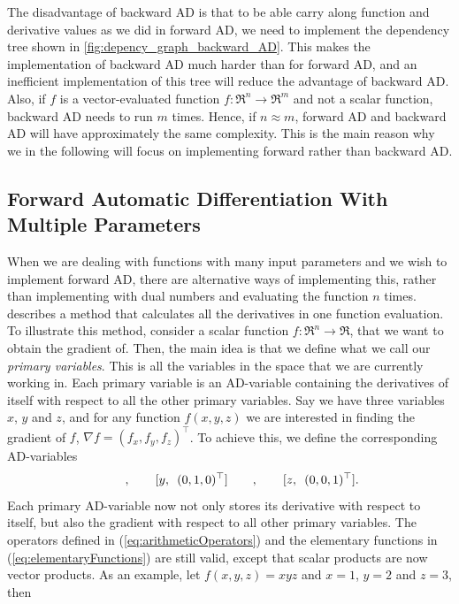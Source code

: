 The disadvantage of backward AD is that to be able carry along function and derivative values as we did in forward AD, we need to implement the dependency tree shown in \autoref{fig:depency_graph_backward_AD}. This makes the implementation of backward AD much harder than for forward AD, and an inefficient implementation of this tree will reduce the advantage of backward AD. Also, if $f$ is a vector-evaluated function $f: \Re^n \rightarrow \Re^m$ and not a scalar function, backward AD needs to run $m$ times. Hence, if $n\approx m$, forward AD and backward AD will have approximately the same complexity. This is the main reason why we in the following will focus on implementing forward rather than backward AD.
\subsection{Forward Automatic Differentiation With Multiple Parameters}
\label{sec:FADWithMultipleParameters}
When we are dealing with functions with many input parameters and we wish to implement forward AD, there are alternative ways of implementing this, rather than implementing with dual numbers and evaluating the function $n$ times.  \citet{doi:10.1137/080743627} describes a method that calculates all the derivatives in one function evaluation. To illustrate this method, consider a scalar function $f: \Re^n \rightarrow \Re$, that we want to obtain the gradient of. Then, the main idea is that we define what we call our \textit{primary variables}. This is all the variables in the space that we are currently working in. Each primary variable is an AD-variable containing the derivatives of itself with respect to all the other primary variables. Say we have three variables $x$, $y$ and $z$, and for any function $f(x,y,z)$ we are interested in finding the gradient of $f$, $\nabla f=(f_x, f_y, f_z)^\top$. To achieve this, we define the corresponding AD-variables
\begin{equation*}
    [\adpair{x}{(1,0,0)^\top}]\hspace{2em},\hspace{2em}
    [\adpair{y}{(0,1,0)^\top}]\hspace{2em},\hspace{2em}
    [\adpair{z}{(0,0,1)^\top}].
\end{equation*}
Each primary AD-variable now not only stores its derivative with respect to itself, but also the gradient with respect to all other primary variables. The operators defined in (\ref{eq:arithmeticOperators}) and the elementary functions in (\ref{eq:elementaryFunctions}) are still valid, except that scalar products are now vector products. As an example, let $f(x,y,z) = xyz$ and $x = 1$, $y = 2$ and $z = 3$, then
